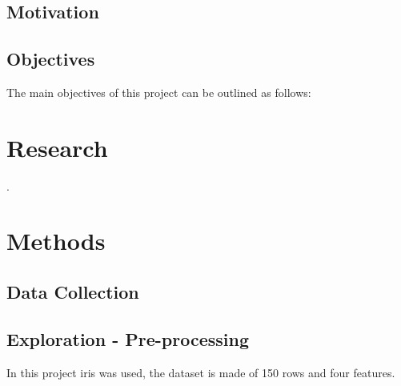 \documentclass[10pt]{article}\usepackage[]{graphicx}\usepackage[]{color}
\begin{document}
\subsection{Motivation}\label{mot}

\subsection{Objectives }\label{obj}
The main objectives of this project can be outlined as follows: 
\section{Research}\label{research}

 \cite{8489087}.




\section {Methods}\label{methods}




\subsection{Data Collection}\label{dataset}





\subsection{Exploration - Pre-processing}\label{explore}


In this project iris was used, the dataset is made of 150 rows and four features. \\
\end{document}
